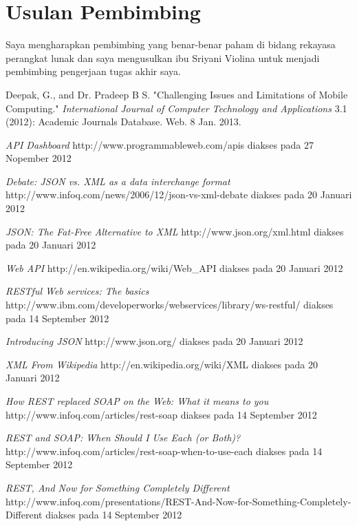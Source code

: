 \documentclass[a4paper, 12pt]{report}
\begin{document}
\section*{Usulan Pembimbing}
\onehalfspacing Saya mengharapkan pembimbing yang benar-benar paham di bidang rekayasa perangkat lunak dan saya mengusulkan ibu Sriyani Violina untuk menjadi pembimbing pengerjaan tugas akhir saya.

\begin{thebibliography}{99}
\singlespacing 


Deepak, G., and Dr. Pradeep B S. "Challenging Issues and Limitations of Mobile Computing." \emph{International Journal of Computer Technology and Applications} 3.1 (2012): Academic Journals Database. Web. 8 Jan. 2013.

  \emph{API Dashboard}
  http://www.programmableweb.com/apis
  diakses pada 27 Nopember 2012
  
  \emph{Debate: JSON vs. XML as a data interchange format}
  http://www.infoq.com/news/2006/12/json-vs-xml-debate
  diakses pada 20 Januari 2012
  
  \emph{JSON: The Fat-Free Alternative to XML}
  http://www.json.org/xml.html
  diakses pada 20 Januari 2012
  
  \emph{Web API}
  http://en.wikipedia.org/wiki/Web\_API
  diakses pada 20 Januari 2012 

  \emph{RESTful Web services: The basics}
  \\http://www.ibm.com/developerworks/webservices/library/ws-restful/
  diakses pada 14 September 2012

  \emph{Introducing JSON} http://www.json.org/
  diakses pada 20 Januari 2012
  
  \emph{XML From Wikipedia} http://en.wikipedia.org/wiki/XML
  diakses pada 20 Januari 2012
  
  \emph{How REST replaced SOAP on the Web: What it means to you}
  http://www.infoq.com/articles/rest-soap
  diakses pada 14 September 2012
  
  \emph{REST and SOAP: When Should I Use Each (or Both)?}
  http://www.infoq.com/articles/rest-soap-when-to-use-each
  diakses pada 14 September 2012
  
  \emph{REST, And Now for Something Completely Different}
  http://www.infoq.com/presentations/REST-And-Now-for-Something-Completely-Different
  diakses pada 14 September 2012
 
\end{thebibliography}
\end{document}
